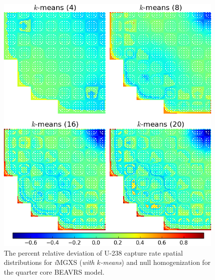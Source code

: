 \begin{figure}[h!]
\centering
\includegraphics[width=0.9\linewidth]{figures/results/compare/full-core/compare-capt-kmeans}
\vspace{2mm}
\caption[U-238 capture rate comparison for the quarter core BEAVRS model]{The percent relative deviation of U-238 capture rate spatial distributions for \textit{i}\ac{MGXS} (\textit{with $k$-means}) and null homogenization for the quarter core BEAVRS model.}
\label{fig:chap11-full-core-capt-rates-kmeans-comp}
\end{figure}

\clearpage

